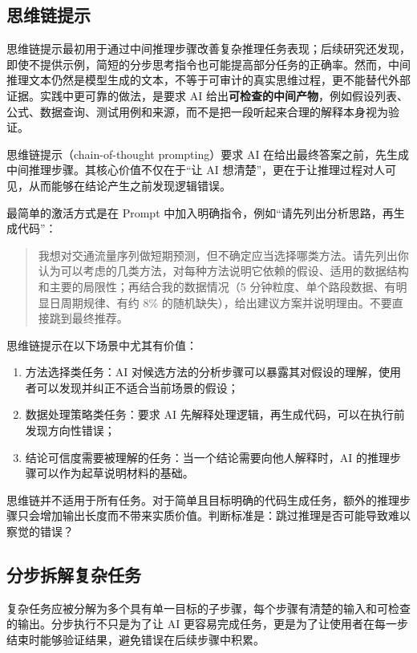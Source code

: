 \subsection{思维链提示}

思维链提示最初用于通过中间推理步骤改善复杂推理任务表现\cite{wei2022chain}；后续研究还发现，即使不提供示例，简短的分步思考指令也可能提高部分任务的正确率\cite{kojima2022large}。然而，中间推理文本仍然是模型生成的文本，不等于可审计的真实思维过程，更不能替代外部证据。实践中更可靠的做法，是要求 AI 给出\textbf{可检查的中间产物}，例如假设列表、公式、数据查询、测试用例和来源，而不是把一段听起来合理的解释本身视为验证。

思维链提示（chain-of-thought prompting）要求 AI 在给出最终答案之前，先生成中间推理步骤。其核心价值不仅在于“让 AI 想清楚”，更在于让推理过程对人可见，从而能够在结论产生之前发现逻辑错误。

最简单的激活方式是在 Prompt 中加入明确指令，例如“请先列出分析思路，再生成代码”：

\begin{quote}
我想对交通流量序列做短期预测，但不确定应当选择哪类方法。请先列出你认为可以考虑的几类方法，对每种方法说明它依赖的假设、适用的数据结构和主要的局限性；再结合我的数据情况（5 分钟粒度、单个路段数据、有明显日周期规律、有约 8\% 的随机缺失），给出建议方案并说明理由。不要直接跳到最终推荐。
\end{quote}

思维链提示在以下场景中尤其有价值：

\begin{enumerate}
  \item 方法选择类任务：AI 对候选方法的分析步骤可以暴露其对假设的理解，使用者可以发现并纠正不适合当前场景的假设；
  \item 数据处理策略类任务：要求 AI 先解释处理逻辑，再生成代码，可以在执行前发现方向性错误；
  \item 结论可信度需要被理解的任务：当一个结论需要向他人解释时，AI 的推理步骤可以作为起草说明材料的基础。
\end{enumerate}

思维链并不适用于所有任务。对于简单且目标明确的代码生成任务，额外的推理步骤只会增加输出长度而不带来实质价值。判断标准是：跳过推理是否可能导致难以察觉的错误？

\subsection{分步拆解复杂任务}
\label{sec:decomposition}

复杂任务应被分解为多个具有单一目标的子步骤，每个步骤有清楚的输入和可检查的输出。分步执行不只是为了让 AI 更容易完成任务，更是为了让使用者在每一步结束时能够验证结果，避免错误在后续步骤中积累。

